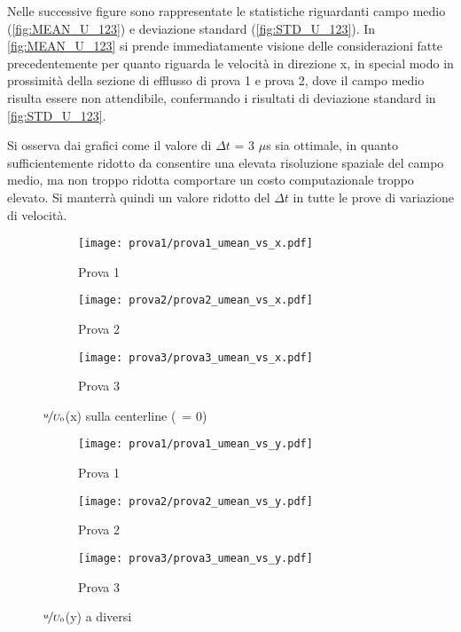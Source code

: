 \documentclass{article} %
\newcommand{\xd}{\nicefrac{\textrm{x}}{\textrm{D}}\ }
\newcommand{\yd}{\nicefrac{\textrm{y}}{\textrm{D}}\ }
\begin{document}
Nelle successive figure sono rappresentate le statistiche riguardanti campo medio (\cref{fig:MEAN_U_123}) e deviazione standard (\cref{fig:STD_U_123}). In \cref{fig:MEAN_U_123} si prende immediatamente visione delle considerazioni fatte precedentemente per quanto riguarda le velocità in direzione x, in special modo in prossimità della sezione di efflusso di prova 1 e prova 2, dove il campo medio risulta essere non attendibile, confermando i risultati di deviazione standard in \cref{fig:STD_U_123}.\par
Si osserva dai grafici come il valore di $\Delta t$ = 3 $\mu$s sia ottimale, in quanto sufficientemente ridotto da consentire una elevata risoluzione spaziale del campo medio, ma non troppo ridotta comportare un costo computazionale troppo elevato. Si manterrà quindi un valore ridotto del $\Delta t$ in tutte le prove di variazione di velocità.
\begin{figure}[b!]
	\centering
	\begin{subfigure}{0.3\textwidth}
		\texttt{[image: prova1/prova1\_umean\_vs\_x.pdf]}
		\label{fig:x_Unorm_1}
		\caption{Prova 1}
	\end{subfigure}
	\begin{subfigure}{0.3\textwidth}
		\texttt{[image: prova2/prova2\_umean\_vs\_x.pdf]}
		\label{fig:x_Unorm_2}
		\caption{Prova 2}
	\end{subfigure}
	\begin{subfigure}{0.3\textwidth}
		\texttt{[image: prova3/prova3\_umean\_vs\_x.pdf]}
		\label{fig:x_Unorm_3}
		\caption{Prova 3}
	\end{subfigure}  
    	\caption{$\nicefrac{u}{U_0}$(x) sulla centerline (\yd = 0)}
	\label{fig:x_Unorm_123}
\end{figure}
\begin{figure}[b!]
	\centering
	\begin{subfigure}{0.3\textwidth}
		\texttt{[image: prova1/prova1\_umean\_vs\_y.pdf]}
		\label{fig:y_Unorm_1}
		\caption{Prova 1}
	\end{subfigure}
	\begin{subfigure}{0.3\textwidth}
		\texttt{[image: prova2/prova2\_umean\_vs\_y.pdf]}
		\label{fig:y_Unorm_2}
		\caption{Prova 2}
	\end{subfigure}  
	\begin{subfigure}{0.3\textwidth}
		\texttt{[image: prova3/prova3\_umean\_vs\_y.pdf]}
		\label{fig:y_Unorm_3}
		\caption{Prova 3}
	\end{subfigure}  
	\caption{$\nicefrac{u}{U_0}$(y) a diversi \xd}
      \label{fig:y_Unorm_123}
\end{figure}
\end{document}
